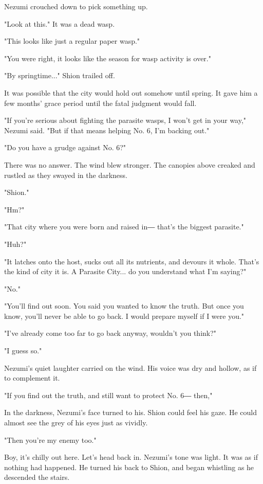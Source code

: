 Nezumi crouched down to pick something up.

"Look at this." It was a dead wasp.

"This looks like just a regular paper wasp."

"You were right, it looks like the season for wasp activity is over."

"By springtime..." Shion trailed off.

It was possible that the city would hold out somehow until spring. It
gave him a few months' grace period until the fatal judgment would fall.

"If you're serious about fighting the parasite wasps, I won't get in
your way," Nezumi said. "But if that means helping No. 6, I'm backing
out."

"Do you have a grudge against No. 6?"

There was no answer. The wind blew stronger. The canopies above creaked
and rustled as they swayed in the darkness.

"Shion."

"Hm?"

"That city where you were born and raised in― that's the biggest
parasite."

"Huh?"

"It latches onto the host, sucks out all its nutrients, and devours it
whole. That's the kind of city it is. A Parasite City... do you
understand what I'm saying?"

"No."

"You'll find out soon. You said you wanted to know the truth. But once
you know, you'll never be able to go back. I would prepare myself if I
were you."

"I've already come too far to go back anyway, wouldn't you think?"

"I guess so."

Nezumi's quiet laughter carried on the wind. His voice was dry and
hollow, as if to complement it.

"If you find out the truth, and still want to protect No. 6― then,"

In the darkness, Nezumi's face turned to his. Shion could feel his gaze.
He could almost see the grey of his eyes just as vividly.~

"Then you're my enemy too."

Boy, it's chilly out here. Let's head back in. Nezumi's tone was light.
It was as if nothing had happened. He turned his back to Shion, and
began whistling as he descended the stairs.

